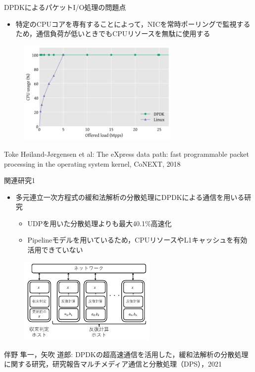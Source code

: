 \documentclass[12pt, unicode]{beamer}
\begin{document}
\begin{frame}{DPDKによるパケットI/O処理の問題点}
  \begin{itemize}
    \item 特定のCPUコアを専有することによって，NICを常時ポーリングで監視するため，通信負荷が低いときでもCPUリソースを無駄に使用する
  \end{itemize}

  \begin{figure}[h]
    \centering
    \includegraphics[width=0.7\textwidth]{pictures/DPDKProblem.png}
  \end{figure}

  \scriptsize{Toke Høiland-Jørgensen et al: The eXpress data path: fast programmable packet processing in the operating system kernel, CoNEXT, 2018}
\end{frame}

\begin{frame}{関連研究1}
  \begin{itemize}
    \item 多元連立一次方程式の緩和法解析の分散処理にDPDKによる通信を用いる研究
    \begin{itemize}
      \item UDPを用いた分散処理よりも最大40.1\%高速化
      \item Pipelineモデルを用いているため，CPUリソースやL1キャッシュを有効活用できていない
    \end{itemize}
  \end{itemize}

  \begin{figure}[h]
    \centering
    \includegraphics[width=0.6\textwidth]{pictures/RelatedWorkOne.pdf}
  \end{figure}

  \scriptsize{伴野 隼一，矢吹 道郎: DPDKの超高速通信を活用した，緩和法解析の分散処理に関する研究，研究報告マルチメディア通信と分散処理（DPS），2021}
\end{frame}
\end{document}

